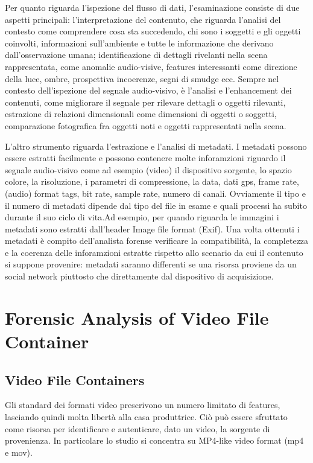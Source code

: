 Per quanto riguarda l'ispezione del flusso di dati, l'esaminazione consiste di due aspetti principali: l'interpretazione del contenuto, che riguarda l'analisi del contesto come comprendere cosa sta succedendo, chi sono i soggetti e gli oggetti coinvolti, informazioni sull'ambiente e tutte le informazione che derivano dall'osservazione umana; identificazione di dettagli rivelanti nella scena rappresentata, come anomalie audio-visive, features interessanti come direzione della luce, ombre, prospettiva incoerenze, segni di smudge ecc. Sempre nel contesto dell'ispezione del segnale audio-visivo, è l'analisi e l'enhancement dei contenuti, come migliorare il segnale per rilevare dettagli o oggetti rilevanti, estrazione di relazioni dimensionali come dimensioni di oggetti o soggetti, comparazione fotografica fra oggetti noti e oggetti rappresentati nella scena.

L'altro strumento riguarda l'estrazione e l'analisi di metadati. I metadati possono essere estratti facilmente e possono contenere molte inforamzioni riguardo il segnale audio-visivo come ad esempio (video) il dispositivo sorgente, lo spazio colore, la risoluzione, i parametri di compressione, la data, dati gps, frame rate, (audio) format tags, bit rate, sample rate, numero di canali. Ovviamente il tipo e il numero di metadati dipende dal tipo del file in esame e quali processi ha subito durante il suo ciclo di vita.Ad esempio, per quando riguarda le immagini i metadati sono estratti dall'header Image file format (Exif). Una volta ottenuti i metadati è compito dell'analista forense verificare la compatibilità, la completezza e la coerenza delle inforamzioni estratte rispetto allo scenario da cui il contenuto si suppone provenire: metadati saranno differenti se una risorsa proviene da un social network piuttosto che direttamente dal dispositivo di acquisizione.



\section{Forensic Analysis of Video File Container}

\subsection{Video File Containers}

Gli standard dei formati video prescrivono un numero limitato di features, lasciando quindi molta libertà alla casa produttrice. Ciò può essere sfruttato come risorsa per identificare e autenticare, dato un video, la sorgente di provenienza. In particolare lo studio si concentra su MP4-like video format (mp4 e mov).

